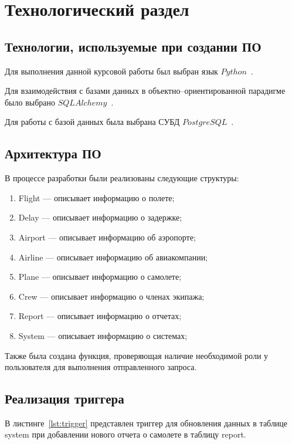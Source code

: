 \chapter{Технологический раздел}

\section{Технологии, используемые при создании ПО}

Для выполнения данной курсовой работы был выбран язык \newline $Python$~\cite{python-lang}.

Для взаимодействия с базами данных в объектно--ориентированной парадигме было выбрано $SQLAlchemy$~\cite{sqlalchemy}.

Для работы с базой данных была выбрана СУБД $PostgreSQL$~\cite{postgresql}.

\section{Архитектура ПО}

В процессе разработки были реализованы следующие структуры:
\begin{enumerate}[label=\arabic*)]
    \item Flight --- описывает информацию о полете;
    \item Delay --- описывает информацию о задержке;
    \item Airport --- описывает информацию об аэропорте;
    \item Airline --- описывает информацию об авиакомпании;
    \item Plane --- описывает информацию о самолете;
    \item Crew --- описывает информацию о членах экипажа;
    \item Report --- описывает информацию о отчетах;
    \item System --- описывает информацию о системах;
\end{enumerate}

Также была создана функция, проверяющая наличие необходимой роли у пользователя для выполнения отправленного запроса.

\section{Реализация триггера}

В листинге~\ref{lst:trigger} представлен триггер для обновления данных в таблице system при добавлении нового отчета о самолете в таблицу report.

